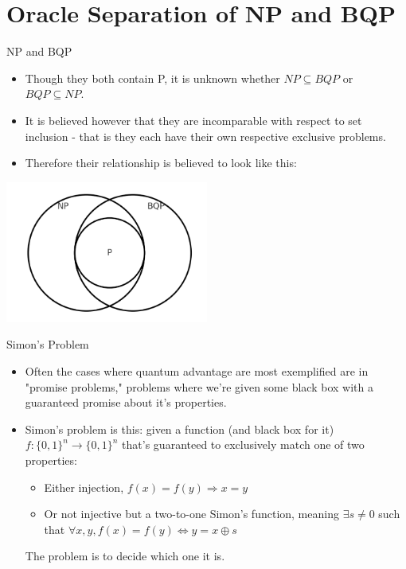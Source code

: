 \documentclass[aspectratio=169]{beamer}
\begin{document}
\section{Oracle Separation of NP and BQP}
\frame{\sectionpage}

\begin{frame}{NP and BQP}
  \begin{itemize}
    \item Though they both contain P, it is unknown whether $NP \subseteq BQP$ or $BQP \subseteq NP$. \pause
    \item It is believed however that they are incomparable with respect to set inclusion - that is they each have their own respective exclusive problems. \pause
    \item Therefore their relationship is believed to look like this:
  \end{itemize}
  \begin{center}
    \includegraphics[width=0.5\textwidth, height=0.5\textheight, keepaspectratio]{BQP-NP.PNG}
  \end{center}
\end{frame}

\begin{frame}{Simon's Problem}
  \begin{itemize}
    \item Often the cases where quantum advantage are most exemplified are in "promise problems," problems where we're given some black box with a guaranteed promise about it's properties. \pause
    \item Simon's problem is this: given a function (and black box for it) $f: \{0, 1\}^n \rightarrow \{0, 1\}^n$ that's guaranteed to exclusively match one of two properties:
    \begin{itemize}
        \item Either injection, $f(x) = f(y) \Rightarrow x = y$
        \item Or not injective but a two-to-one Simon's function, meaning $\exists s \neq 0$ such that $\forall x, y, f(x) = f(y) \Leftrightarrow y = x \oplus s$
    \end{itemize}
    The problem is to decide which one it is.
  \end{itemize}
\end{frame}
\end{document}
